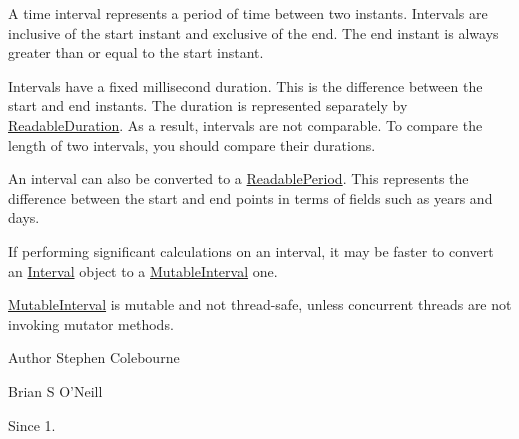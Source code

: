 A time interval represents a period of time between two instants. Intervals are inclusive of the start instant and exclusive of the end. The end instant is always greater than or equal to the start instant. 

Intervals have a fixed millisecond duration. This is the difference between the start and end instants. The duration is represented separately by \hyperlink{interfaceorg_1_1joda_1_1time_1_1_readable_duration}{Readable\-Duration}. As a result, intervals are not comparable. To compare the length of two intervals, you should compare their durations. 

An interval can also be converted to a \hyperlink{interfaceorg_1_1joda_1_1time_1_1_readable_period}{Readable\-Period}. This represents the difference between the start and end points in terms of fields such as years and days. 

If performing significant calculations on an interval, it may be faster to convert an \hyperlink{classorg_1_1joda_1_1time_1_1_interval}{Interval} object to a \hyperlink{classorg_1_1joda_1_1time_1_1_mutable_interval}{Mutable\-Interval} one. 

\hyperlink{classorg_1_1joda_1_1time_1_1_mutable_interval}{Mutable\-Interval} is mutable and not thread-\/safe, unless concurrent threads are not invoking mutator methods.

\begin{DoxyAuthor}{Author}
Stephen Colebourne 

Brian S O'Neill 
\end{DoxyAuthor}
\begin{DoxySince}{Since}
1. 
\end{DoxySince}


